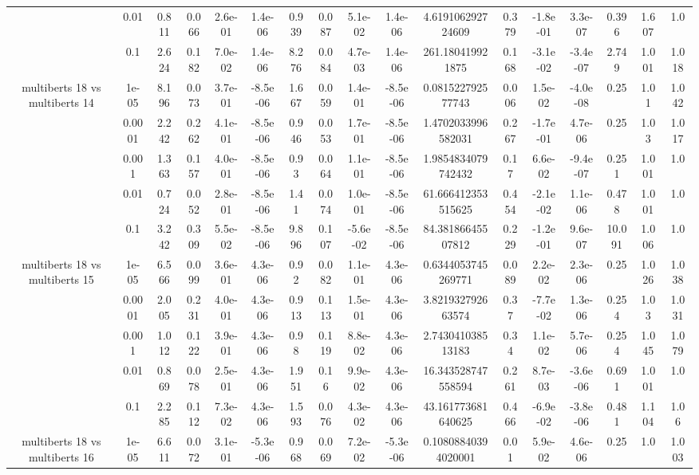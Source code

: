 \begin{tabular}{|c|c|c|c|c|c|c|c|c|c|c|c|c|c|c|c|c|}
 & 0.01 & 0.811 & 0.066 & 2.6e-01 & 1.4e-06 & 0.939 & 0.087 & 5.1e-02 & 1.4e-06 & 4.619106292724609 & 0.379 & -1.8e-01 & 3.3e-07 & 0.396 & 1.607 & 1.0 \\
 & 0.1 & 2.624 & 0.182 & 7.0e-02 & 1.4e-06 & 8.276 & 0.084 & 4.7e-03 & 1.4e-06 & 261.180419921875 & 0.168 & -3.1e-02 & -3.4e-07 & 2.749 & 1.001 & 1.018 \\
\hline
\multirow{5}{*}{multiberts 18 vs multiberts 14} & 1e-05 & 8.196 & 0.073 & 3.7e-01 & -8.5e-06 & 1.667 & 0.059 & 1.4e-01 & -8.5e-06 & 0.081522792577743 & 0.006 & 1.5e-02 & -4.0e-08 & 0.25 & 1.01 & 1.042 \\
 & 0.0001 & 2.242 & 0.262 & 4.1e-01 & -8.5e-06 & 0.946 & 0.053 & 1.7e-01 & -8.5e-06 & 1.4702033996582031 & 0.267 & -1.7e-01 & 4.7e-06 & 0.25 & 1.03 & 1.017 \\
 & 0.001 & 1.363 & 0.157 & 4.0e-01 & -8.5e-06 & 0.93 & 0.064 & 1.1e-01 & -8.5e-06 & 1.9854834079742432 & 0.17 & 6.6e-02 & -9.4e-07 & 0.251 & 1.001 & 1.0 \\
 & 0.01 & 0.724 & 0.052 & 2.8e-01 & -8.5e-06 & 1.41 & 0.074 & 1.0e-01 & -8.5e-06 & 61.666412353515625 & 0.454 & -2.1e-02 & 1.1e-06 & 0.478 & 1.001 & 1.0 \\
 & 0.1 & 3.242 & 0.309 & 5.5e-02 & -8.5e-06 & 9.896 & 0.107 & -5.6e-02 & -8.5e-06 & 84.38186645507812 & 0.229 & -1.2e-01 & 9.6e-07 & 10.091 & 1.006 & 1.0 \\
\hline
\multirow{5}{*}{multiberts 18 vs multiberts 15} & 1e-05 & 6.566 & 0.099 & 3.6e-01 & 4.3e-06 & 0.92 & 0.082 & 1.1e-01 & 4.3e-06 & 0.6344053745269771 & 0.089 & 2.2e-02 & 2.3e-06 & 0.25 & 1.026 & 1.038 \\
 & 0.0001 & 2.005 & 0.231 & 4.0e-01 & 4.3e-06 & 0.913 & 0.113 & 1.5e-01 & 4.3e-06 & 3.821932792663574 & 0.37 & -7.7e-02 & 1.3e-06 & 0.254 & 1.03 & 1.031 \\
 & 0.001 & 1.012 & 0.122 & 3.9e-01 & 4.3e-06 & 0.98 & 0.119 & 8.8e-02 & 4.3e-06 & 2.743041038513183 & 0.34 & 1.1e-02 & 5.7e-06 & 0.254 & 1.045 & 1.079 \\
 & 0.01 & 0.869 & 0.078 & 2.5e-01 & 4.3e-06 & 1.951 & 0.16 & 9.9e-02 & 4.3e-06 & 16.343528747558594 & 0.261 & 8.7e-03 & -3.6e-06 & 0.691 & 1.001 & 1.0 \\
 & 0.1 & 2.285 & 0.112 & 7.3e-02 & 4.3e-06 & 1.593 & 0.076 & 4.3e-02 & 4.3e-06 & 43.161773681640625 & 0.466 & -6.9e-02 & -3.8e-06 & 0.481 & 1.104 & 1.06 \\
\hline
\multirow{5}{*}{multiberts 18 vs multiberts 16} & 1e-05 & 6.611 & 0.072 & 3.1e-01 & -5.3e-06 & 0.968 & 0.069 & 7.2e-02 & -5.3e-06 & 0.10808840394020001 & 0.01 & 5.9e-02 & 4.6e-06 & 0.25 & 1.0 & 1.003 \\

\end{tabular}
